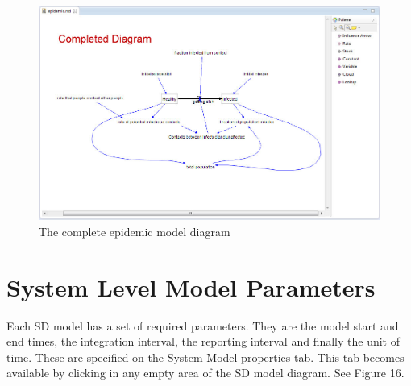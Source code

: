 \documentclass[11pt]{amsart}
\begin{document}
\begin{figure}[ht]
\begin{center}
\vspace{.2in}
\centerline {
\includegraphics[totalheight=0.3\textheight]{images/015.jpg}
}
\caption{The complete epidemic model diagram}
\label{fig:015}
\end{center}
\end{figure}

\clearpage

\section{System Level Model Parameters}
Each SD model has a set of required parameters. They are the model start and end times, the integration interval, the reporting interval and finally the unit of time. These are specified on the System Model properties tab. This tab becomes available by clicking in any empty area of the SD model diagram. See Figure 16.
\end{document}
